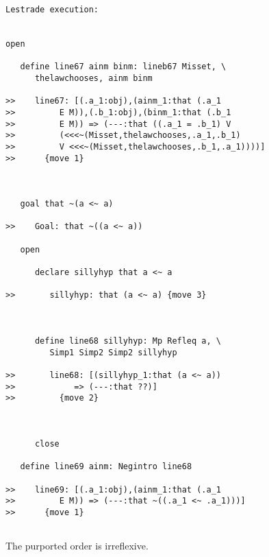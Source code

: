 \documentclass[12pt]{article}
\begin{document}
\begin{verbatim}Lestrade execution:


open

   define line67 ainm binm: lineb67 Misset, \
      thelawchooses, ainm binm

>>    line67: [(.a_1:obj),(ainm_1:that (.a_1
>>         E M)),(.b_1:obj),(binm_1:that (.b_1
>>         E M)) => (---:that ((.a_1 = .b_1) V
>>         (<<<~(Misset,thelawchooses,.a_1,.b_1)
>>         V <<<~(Misset,thelawchooses,.b_1,.a_1))))]
>>      {move 1}



   goal that ~(a <~ a)

>>    Goal: that ~((a <~ a))

   open

      declare sillyhyp that a <~ a

>>       sillyhyp: that (a <~ a) {move 3}



      define line68 sillyhyp: Mp Refleq a, \
         Simp1 Simp2 Simp2 sillyhyp

>>       line68: [(sillyhyp_1:that (a <~ a))
>>            => (---:that ??)]
>>         {move 2}



      close

   define line69 ainm: Negintro line68

>>    line69: [(.a_1:obj),(ainm_1:that (.a_1
>>         E M)) => (---:that ~((.a_1 <~ .a_1)))]
>>      {move 1}


\end{verbatim}

The purported order is irreflexive.
\end{document}
